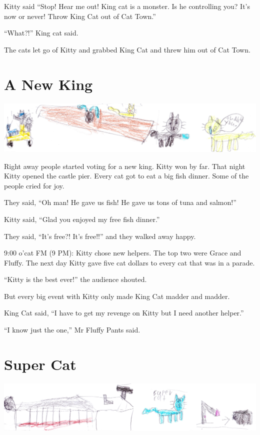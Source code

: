 \documentclass[12pt,oneside]{krantz}
\begin{document}
Kitty said ``Stop! Hear me out! King cat is a monster. Is he controlling
you? It's now or never! Throw King Cat out of Cat Town.''

``What?!'' King cat said.

The cats let go of Kitty and grabbed King Cat and threw him out of Cat
Town.

\hypertarget{a-new-king}{%
\chapter{A New King}\label{a-new-king}}

\includegraphics{img/thankyou.jpg}

Right away people started voting for a new king. Kitty won by far. That
night Kitty opened the castle pier. Every cat got to eat a big fish
dinner. Some of the people cried for joy.

They said, ``Oh man! He gave us fish! He gave us tons of tuna and
salmon!''

Kitty said, ``Glad you enjoyed my free fish dinner.''

They said, ``It's free?! It's free!!'' and they walked away happy.

9:00 o'cat FM (9 PM): Kitty chose new helpers. The top two were Grace
and Fluffy. The next day Kitty gave five cat dollars to every cat that
was in a parade.

``Kitty is the best ever!'' the audience shouted.

But every big event with Kitty only made King Cat madder and madder.

King Cat said, ``I have to get my revenge on Kitty but I need another
helper.''

``I know just the one,'' Mr Fluffy Pants said.

\hypertarget{super-cat}{%
\chapter{Super Cat}\label{super-cat}}

\includegraphics{img/supercat.jpg}
\end{document}
